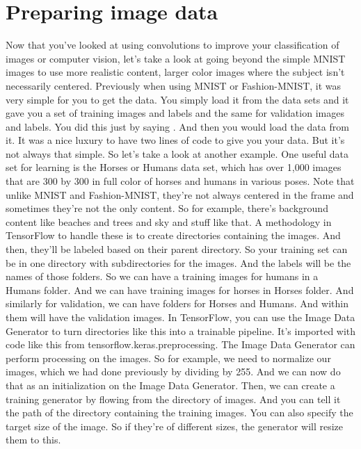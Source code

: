 \section{Preparing image data}

Now that you've looked at using convolutions
to improve your classification of images or computer vision,
let's take a look at going beyond the simple MNIST images
to use more realistic content, larger color images where
the subject isn't necessarily centered.
Previously when using MNIST or Fashion-MNIST,
it was very simple for you to get the data.
You simply load it from the data sets and it gave you
a set of training images and labels and the same for validation images
and labels.
You did this just by saying .
And then you would load the data from it.
It was a nice luxury to have two lines of code to give you your data.
But it's not always that simple.
So let's take a look at another example.
One useful data set for learning is the Horses or Humans data
set, which has over 1,000 images that are 300 by 300
in full color of horses and humans in various poses.
Note that unlike MNIST and Fashion-MNIST,
they're not always centered in the frame and sometimes they're
not the only content.
So for example, there's background content like beaches and trees
and sky and stuff like that.
A methodology in TensorFlow to handle these
is to create directories containing the images.
And then, they'll be labeled based on their parent directory.
So your training set can be in one directory
with subdirectories for the images.
And the labels will be the names of those folders.
So we can have a training images for humans in a Humans folder.
And we can have training images for horses in Horses folder.
And similarly for validation, we can have folders for Horses and Humans.
And within them will have the validation images.
In TensorFlow, you can use the Image Data Generator to turn directories
like this into a trainable pipeline.
It's imported with code like this from tensorflow.keras.preprocessing.
The Image Data Generator can perform processing on the images.
So for example, we need to normalize our images, which we had done previously
by dividing by 255.
And we can now do that as an initialization on the Image Data
Generator.
Then, we can create a training generator by flowing
from the directory of images.
And you can tell it the path of the directory containing the training
images.
You can also specify the target size of the image.
So if they're of different sizes, the generator will resize them to this.

